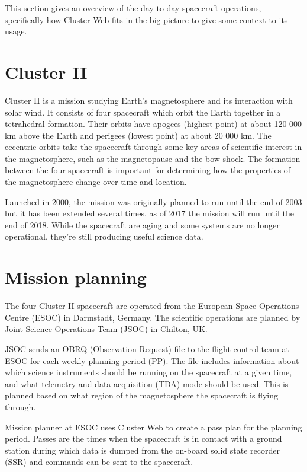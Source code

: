 
This section gives an overview of the day-to-day spacecraft operations, specifically how Cluster Web fits in the big picture to give some context to its usage.

\section{Cluster II}
Cluster II is a mission studying Earth's magnetosphere and its interaction with solar wind. It consists of four spacecraft which orbit the Earth together in a tetrahedral formation. Their orbits have apogees (highest point) at about 120 000 km above the Earth and perigees (lowest point) at about 20 000 km. The eccentric orbits take the spacecraft through some key areas of scientific interest in the magnetosphere, such as the magnetopause and the bow shock. The formation between the four spacecraft is important for determining how the properties of the magnetosphere change over time and location.

Launched in 2000, the mission was originally planned to run until the end of 2003 but it has been extended several times, as of 2017 the mission will run until the end of 2018. While the spacecraft are aging and some systems are no longer operational, they're still producing useful science data.

\section{Mission planning}
The four Cluster II spacecraft are operated from the European Space Operations Centre (ESOC) in Darmstadt, Germany. The scientific operations are planned by Joint Science Operations Team (JSOC) in Chilton, UK.

JSOC sends an OBRQ (Observation Request) file to the flight control team at ESOC for each weekly planning period (PP). The file includes information about which science instruments should be running on the spacecraft at a given time, and what telemetry and data acquisition (TDA) mode should be used. This is planned based on what region of the magnetosphere the spacecraft is flying through.

Mission planner at ESOC uses Cluster Web to create a pass plan for the planning period. Passes are the times when the spacecraft is in contact with a ground station during which data is dumped from the on-board solid state recorder (SSR) and commands can be sent to the spacecraft. 

